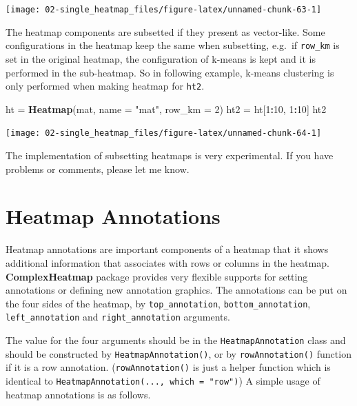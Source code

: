 \documentclass[]{book}
\newenvironment{Shaded}{\begin{snugshade}}{\end{snugshade}}
\newcommand{\KeywordTok}[1]{\textcolor[rgb]{0.13,0.29,0.53}{\textbf{#1}}}
\newcommand{\DataTypeTok}[1]{\textcolor[rgb]{0.13,0.29,0.53}{#1}}
\newcommand{\DecValTok}[1]{\textcolor[rgb]{0.00,0.00,0.81}{#1}}
\newcommand{\StringTok}[1]{\textcolor[rgb]{0.31,0.60,0.02}{#1}}
\newcommand{\OperatorTok}[1]{\textcolor[rgb]{0.81,0.36,0.00}{\textbf{#1}}}
\newcommand{\NormalTok}[1]{#1}
\theoremstyle{definition}
\theoremstyle{definition}
\theoremstyle{definition}
\theoremstyle{remark}
\begin{document}
\begin{center}\texttt{[image: 02-single\_heatmap\_files/figure-latex/unnamed-chunk-63-1]} \end{center}

The heatmap components are subsetted if they present as vector-like.
Some configurations in the heatmap keep the same when subsetting,
e.g.~if \texttt{row\_km} is set in the original heatmap, the
configuration of k-means is kept and it is performed in the sub-heatmap.
So in following example, k-means clustering is only performed when
making heatmap for \texttt{ht2}.

\begin{Shaded}
\begin{Highlighting}[]
\NormalTok{ht =}\StringTok{ }\KeywordTok{Heatmap}\NormalTok{(mat, }\DataTypeTok{name =} \StringTok{"mat"}\NormalTok{, }\DataTypeTok{row_km =} \DecValTok{2}\NormalTok{)}
\NormalTok{ht2 =}\StringTok{ }\NormalTok{ht[}\DecValTok{1}\OperatorTok{:}\DecValTok{10}\NormalTok{, }\DecValTok{1}\OperatorTok{:}\DecValTok{10}\NormalTok{]}
\NormalTok{ht2}
\end{Highlighting}
\end{Shaded}

\begin{center}\texttt{[image: 02-single\_heatmap\_files/figure-latex/unnamed-chunk-64-1]} \end{center}

The implementation of subsetting heatmaps is very experimental. If you
have problems or comments, please let me know.

\chapter{Heatmap Annotations}\label{heatmap-annotations}

Heatmap annotations are important components of a heatmap that it shows
additional information that associates with rows or columns in the
heatmap. \textbf{ComplexHeatmap} package provides very flexible supports
for setting annotations or defining new annotation graphics. The
annotations can be put on the four sides of the heatmap, by
\texttt{top\_annotation}, \texttt{bottom\_annotation},
\texttt{left\_annotation} and \texttt{right\_annotation} arguments.

The value for the four arguments should be in the
\texttt{HeatmapAnnotation} class and should be constructed by
\texttt{HeatmapAnnotation()}, or by \texttt{rowAnnotation()} function if
it is a row annotation. (\texttt{rowAnnotation()} is just a helper
function which is identical to
\texttt{HeatmapAnnotation(...,\ which\ =\ "row")}) A simple usage of
heatmap annotations is as follows.
\end{document}

